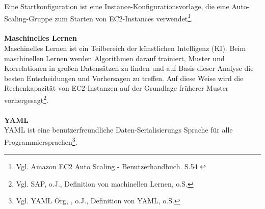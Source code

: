 Eine Startkonfiguration ist eine Instance-Konfigurationsvorlage, die eine Auto-Scaling-Gruppe zum Starten von EC2-Instances verwendet\footnote{Vgl. Amazon EC2 Auto Scaling - Benutzerhandbuch. S.54 \cite{AMZ31}}.
\\\\
\textbf{Maschinelles Lernen}\\
Maschinelles Lernen ist ein Teilbereich der künstlichen Intelligenz (KI). Beim maschinellen Lernen werden Algorithmen darauf trainiert, Muster und Korrelationen in großen Datensätzen zu finden und auf Basis dieser Analyse die besten Entscheidungen und Vorhersagen zu treffen. Auf diese Weise wird die Rechenkapazität von EC2-Instanzen auf der Grundlage früherer Muster vorhergesagt\footnote{Vgl. SAP, o.J., Definition von machinellen Lernen, o.S.\cite{ML1}}.
\\\\
\textbf{YAML}\\
YAML ist eine benutzerfreundliche Daten-Serialisierungs  Sprache für alle Programmiersprachen\footnote{Vgl. YAML Org, , o.J., Definition von YAML, o.S.\cite{YAML}}.

